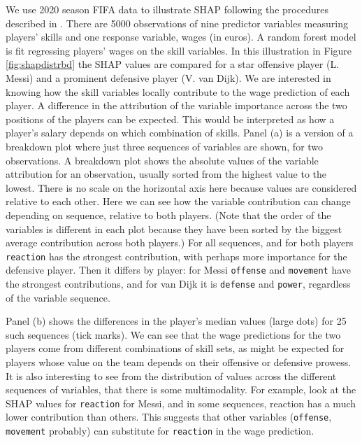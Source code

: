 \documentclass[
]{sn-jnl}
\begin{document}
We use 2020 season FIFA data \citep{leone_fifa_2020} to illustrate SHAP
following the procedures described in \citet{biecek_explanatory_2021}.
There are 5000 observations of nine predictor variables measuring
players' skills and one response variable, wages (in euros). A random
forest model is fit regressing players' wages on the skill variables. In
this illustration in Figure \ref{fig:shapdistrbd} the SHAP values are
compared for a star offensive player (L. Messi) and a prominent
defensive player (V. van Dijk). We are interested in knowing how the
skill variables locally contribute to the wage prediction of each
player. A difference in the attribution of the variable importance
across the two positions of the players can be expected. This would be
interpreted as how a player's salary depends on which combination of
skills. Panel (a) is a version of a breakdown plot
\citep{gosiewska_ibreakdown_2019} where just three sequences of
variables are shown, for two observations. A breakdown plot shows the
absolute values of the variable attribution for an observation, usually
sorted from the highest value to the lowest. There is no scale on the
horizontal axis here because values are considered relative to each
other. Here we can see how the variable contribution can change
depending on sequence, relative to both players. (Note that the order of
the variables is different in each plot because they have been sorted by
the biggest average contribution across both players.) For all
sequences, and for both players \texttt{reaction} has the strongest
contribution, with perhaps more importance for the defensive player.
Then it differs by player: for Messi \texttt{offense} and
\texttt{movement} have the strongest contributions, and for van Dijk it
is \texttt{defense} and \texttt{power}, regardless of the variable
sequence.

Panel (b) shows the differences in the player's median values (large
dots) for 25 such sequences (tick marks). We can see that the wage
predictions for the two players come from different combinations of
skill sets, as might be expected for players whose value on the team
depends on their offensive or defensive prowess. It is also interesting
to see from the distribution of values across the different sequences of
variables, that there is some multimodality. For example, look at the
SHAP values for \texttt{reaction} for Messi, and in some sequences,
reaction has a much lower contribution than others. This suggests that
other variables (\texttt{offense}, \texttt{movement} probably) can
substitute for \texttt{reaction} in the wage prediction.
\end{document}

